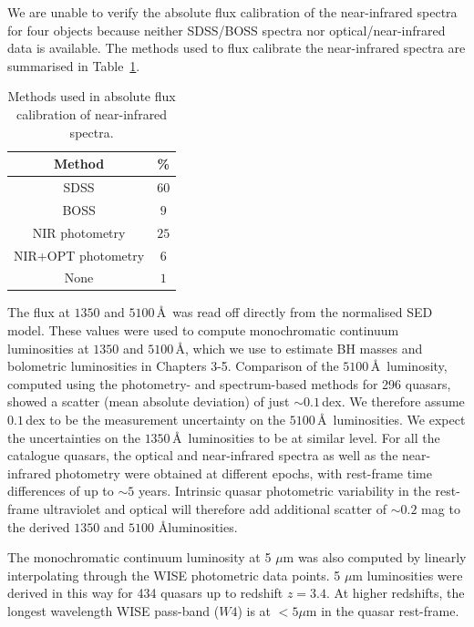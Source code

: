 We are unable to verify the absolute flux calibration of the near-infrared spectra for four objects because neither SDSS/BOSS spectra nor optical/near-infrared data is available. 
The methods used to flux calibrate the near-infrared spectra are summarised in Table~\ref{tab:flux_calibration}. 

\begin{table}
  \centering
  \footnotesize 
  \caption{Methods used in absolute flux calibration of near-infrared spectra.}
  \label{tab:flux_calibration}
    \begin{tabular}{cc} 
    \hline
    Method & \% \\
    \hline
    SDSS               & $60$ \\
    BOSS               & $9$ \\
    NIR photometry     & $25$ \\
    NIR+OPT photometry & $6$ \\
    None               & $1$ \\    
    \hline
    \end{tabular}
\end{table} 

The flux at $1350$ and $5100$\,\AA\, was read off directly from the normalised SED model.
These values were used to compute monochromatic continuum luminosities at $1350$ and $5100$\,\AA, which we use to estimate BH masses and bolometric luminosities in Chapters 3-5. 
Comparison of the $5100$\,\AA\, luminosity, computed using the photometry- and spectrum-based methods for 296 quasars, showed a scatter (mean absolute deviation) of just $\sim0.1$\,dex.
We therefore assume $0.1$\,dex to be the measurement uncertainty on the $5100$\,\AA\, luminosities.
We expect the uncertainties on the $1350$\,\AA\, luminosities to be at similar level.  
For all the catalogue quasars, the optical and near-infrared spectra as well as the near-infrared photometry were obtained at different epochs, with rest-frame time differences of up to $\sim5$ years. 
Intrinsic quasar photometric variability in the rest-frame ultraviolet and optical will therefore add additional scatter of $\sim0.2$ mag \citep[e.g.][]{macleod10} to the derived $1350$ and $5100$ \AA luminosities.

The monochromatic continuum luminosity at 5 $\mu$m was also computed by linearly interpolating through the WISE photometric data points. 
5 $\mu$m luminosities were derived in this way for 434 quasars up to redshift $z=3.4$. 
At higher redshifts, the longest wavelength WISE pass-band ($W4$) is at $<5\mu$m in the quasar rest-frame.

